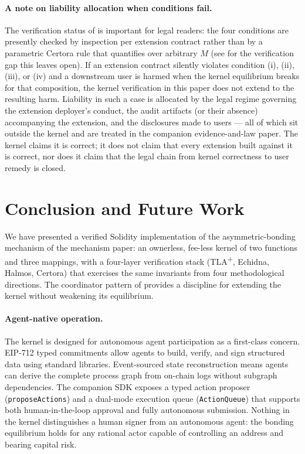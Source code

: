 \documentclass[11pt,a4paper]{article}
\theoremstyle{definition}
\theoremstyle{remark}
\begin{document}
\paragraph{A note on liability allocation when conditions fail.}
The verification status of  is important
for legal readers: the four conditions are presently checked by
inspection per extension contract rather than by a parametric
Certora rule that quantifies over arbitrary $M$ (see
 for the verification gap this leaves open).
If an extension contract silently violates condition (i), (ii),
(iii), or (iv) and a downstream user is harmed when the kernel
equilibrium breaks for that composition, the kernel verification
in this paper does not extend to the resulting harm. Liability in
such a case is allocated by the legal regime governing the
extension deployer's conduct, the audit artifacts (or their
absence) accompanying the extension, and the disclosures made to
users --- all of which sit outside the kernel and are treated in
the companion evidence-and-law paper. The
kernel claims it is correct; it does not claim that every
extension built against it is correct, nor does it claim that
the legal chain from kernel correctness to user remedy is
closed.

\section{Conclusion and Future Work}
\label{sec:conclusion}

We have presented a verified Solidity implementation of the
asymmetric-bonding mechanism of the mechanism paper: an
ownerless, fee-less kernel of two functions and three mappings, with
a four-layer verification stack (TLA\textsuperscript{+}, Echidna,
Halmos, Certora) that exercises the same invariants from four
methodological directions. The coordinator pattern of
 provides a discipline for extending the
kernel without weakening its equilibrium.

\paragraph{Agent-native operation.}
The kernel is designed for autonomous agent participation as a
first-class concern. EIP-712 typed commitments allow agents to
build, verify, and sign structured data using standard libraries.
Event-sourced state reconstruction means agents can derive the
complete process graph from on-chain logs without subgraph
dependencies. The companion SDK exposes a typed action proposer
(\texttt{proposeActions}) and a dual-mode execution queue
(\texttt{ActionQueue}) that supports both human-in-the-loop approval
and fully autonomous submission. Nothing in the kernel
distinguishes a human signer from an autonomous agent: the bonding
equilibrium holds for any rational actor capable of controlling an
address and bearing capital risk.
\end{document}
